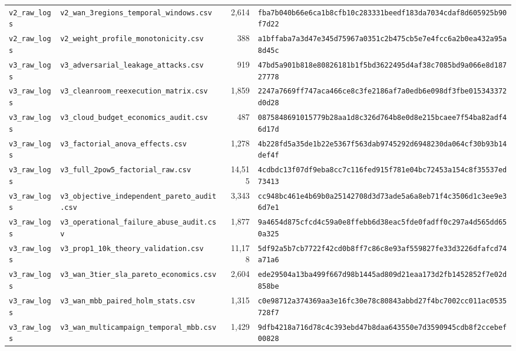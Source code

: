 \begin{table}[t]
{\begin{tabular}{@{}llrl@{}}
\texttt{v2\_raw\_logs} & \texttt{v2\_wan\_3regions\_temporal\_windows.csv} & 2,614 & \texttt{fba7b040b66e6ca1b8cfb10c283331beedf183da7034cdaf8d605925b90f7d22} \\
\texttt{v2\_raw\_logs} & \texttt{v2\_weight\_profile\_monotonicity.csv} & 388 & \texttt{a1bffaba7a3d47e345d75967a0351c2b475cb5e7e4fcc6a2b0ea432a95a8d45c} \\
\texttt{v3\_raw\_logs} & \texttt{v3\_adversarial\_leakage\_attacks.csv} & 919 & \texttt{47bd5a901b818e80826181b1f5bd3622495d4af38c7085bd9a066e8d18727778} \\
\texttt{v3\_raw\_logs} & \texttt{v3\_cleanroom\_reexecution\_matrix.csv} & 1,859 & \texttt{2247a7669ff747aca466ce8c3fe2186af7a0edb6e098df3fbe015343372d0d28} \\
\texttt{v3\_raw\_logs} & \texttt{v3\_cloud\_budget\_economics\_audit.csv} & 487 & \texttt{0875848691015779b28aa1d8c326d764b8e0d8e215bcaee7f54ba82adf46d17d} \\
\texttt{v3\_raw\_logs} & \texttt{v3\_factorial\_anova\_effects.csv} & 1,278 & \texttt{4b228fd5a35de1b22e5367f563dab9745292d6948230da064cf30b93b14def4f} \\
\texttt{v3\_raw\_logs} & \texttt{v3\_full\_2pow5\_factorial\_raw.csv} & 14,515 & \texttt{4cdbdc13f07df9eba8cc7c116fed915f781e04bc72453a154c8f35537ed73413} \\
\texttt{v3\_raw\_logs} & \texttt{v3\_objective\_independent\_pareto\_audit.csv} & 3,343 & \texttt{cc948bc461e4b69b0a25142708d3d73ade5a6a8eb71f4c3506d1c3ee9e36d7e1} \\
\texttt{v3\_raw\_logs} & \texttt{v3\_operational\_failure\_abuse\_audit.csv} & 1,877 & \texttt{9a4654d875cfcd4c59a0e8ffebb6d38eac5fde0fadff0c297a4d565dd650a325} \\
\texttt{v3\_raw\_logs} & \texttt{v3\_prop1\_10k\_theory\_validation.csv} & 11,178 & \texttt{5df92a5b7cb7722f42cd0b8ff7c86c8e93af559827fe33d3226dfafcd74a71a6} \\
\texttt{v3\_raw\_logs} & \texttt{v3\_wan\_3tier\_sla\_pareto\_economics.csv} & 2,604 & \texttt{ede29504a13ba499f667d98b1445ad809d21eaa173d2fb1452852f7e02d858be} \\
\texttt{v3\_raw\_logs} & \texttt{v3\_wan\_mbb\_paired\_holm\_stats.csv} & 1,315 & \texttt{c0e98712a374369aa3e16fc30e78c80843abbd27f4bc7002cc011ac0535728f7} \\
\texttt{v3\_raw\_logs} & \texttt{v3\_wan\_multicampaign\_temporal\_mbb.csv} & 1,429 & \texttt{9dfb4218a716d78c4c393ebd47b8daa643550e7d3590945cdb8f2ccebef00828} \\
\bottomrule
\end{tabular}%
}
\end{table}
